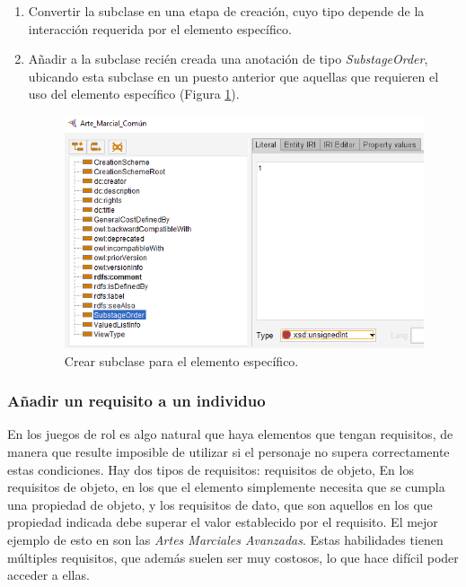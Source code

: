 \begin{enumerate}
    \item Convertir la subclase en una etapa de creación, cuyo tipo depende de la interacción requerida por el elemento específico.
    \item Añadir a la subclase recién creada una anotación de tipo \textit{SubstageOrder}, ubicando esta subclase en un puesto 
    anterior que aquellas que requieren el uso del elemento específico (Figura \ref*{ElementoComun_2}).
    \begin{figure}[H]
        \centering
        \includegraphics[scale=0.6]{Figures/Protege/ElementoComun_2.png}
        \caption{Crear subclase para el elemento específico.}
        \label{ElementoComun_2}
    \end{figure}

\end{enumerate}

\subsubsection{Añadir un requisito a un individuo}
En los juegos de rol es algo natural que haya elementos que tengan requisitos, de manera que resulte imposible de utilizar si 
el personaje no supera correctamente estas condiciones. Hay dos tipos de requisitos: requisitos de objeto, En los requisitos de objeto, 
en los que el elemento simplemente necesita que se cumpla una propiedad de objeto, y los requisitos de dato, que son aquellos en los que 
propiedad indicada debe superar el valor establecido por el requisito. El mejor ejemplo de esto en \anima son las 
\textit{Artes Marciales Avanzadas}. Estas habilidades tienen múltiples requisitos, que además suelen ser muy costosos, 
lo que hace difícil poder acceder a ellas. \medskip 

